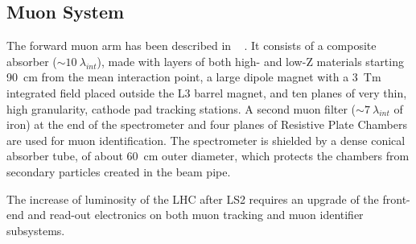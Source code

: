 \subsection{Muon System}

The forward muon arm has been described in ~\cite{Aamodt:2008zz} . It consists of a
composite absorber ($\sim 10\ \lambda_{int}$), made with layers of
both high- and low-Z materials starting 90 cm from the mean
interaction point, a large dipole magnet with a 3 Tm integrated field
placed outside the L3 barrel magnet, and ten planes of very thin, high
granularity, cathode pad tracking stations. A second muon filter
($\sim 7\ \lambda_{int}$ of iron) at the end of the spectrometer and
four planes of Resistive Plate Chambers are used for muon
identification. The spectrometer is shielded by a dense conical
absorber tube, of about 60 cm outer diameter, which protects the
chambers from secondary particles created in the beam pipe.

The increase of luminosity of the LHC after LS2 requires an upgrade of
the front-end and read-out electronics on both muon
tracking and muon identifier subsystems.



